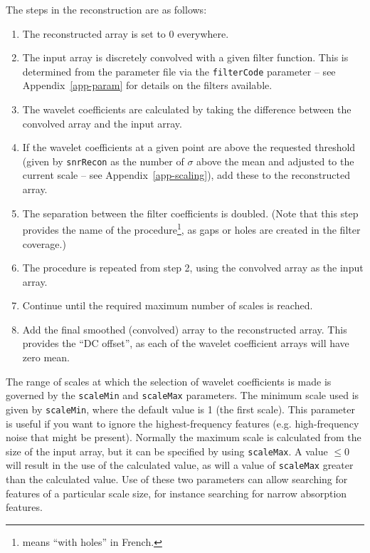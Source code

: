 The steps in the \atrous reconstruction are as follows:
\begin{enumerate}
\item The reconstructed array is set to 0 everywhere.
\item The input array is discretely convolved with a given filter
  function. This is determined from the parameter file via the
  \texttt{filterCode} parameter -- see Appendix~\ref{app-param} for
  details on the filters available.
\item The wavelet coefficients are calculated by taking the difference
  between the convolved array and the input array.
\item If the wavelet coefficients at a given point are above the
  requested threshold (given by \texttt{snrRecon} as the number of
  $\sigma$ above the mean and adjusted to the current scale -- see
  Appendix~\ref{app-scaling}), add these to the reconstructed array.
\item The separation between the filter coefficients is doubled. (Note
  that this step provides the name of the procedure\footnote{\atrous
  means ``with holes'' in French.}, as gaps or holes are created in
  the filter coverage.)
\item The procedure is repeated from step 2, using the convolved array
  as the input array.
\item Continue until the required maximum number of scales is reached.
\item Add the final smoothed (\ie convolved) array to the
  reconstructed array. This provides the ``DC offset'', as each of the
  wavelet coefficient arrays will have zero mean.
\end{enumerate}

The range of scales at which the selection of wavelet coefficients is
made is governed by the \texttt{scaleMin} and \texttt{scaleMax}
parameters. The minimum scale used is given by \texttt{scaleMin},
where the default value is 1 (the first scale). This parameter is
useful if you want to ignore the highest-frequency features
(e.g. high-frequency noise that might be present). Normally the
maximum scale is calculated from the size of the input array, but it
can be specified by using \texttt{scaleMax}. A value $\le0$ will
result in the use of the calculated value, as will a value of
\texttt{scaleMax} greater than the calculated value. Use of these two
parameters can allow searching for features of a particular scale
size, for instance searching for narrow absorption features.

